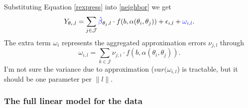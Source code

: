\documentclass[11pt]{amsart}
\newcommand{\tj}{\theta_j}
\newcommand{\ti}{\theta_i}
\newcommand{\ytil}{Y_{\theta_i,l}}
\begin{document}
Substituting Equation \eqref{rexpress} into \eqref{neighbor} we get
\begin{equation}
\ytil = \sum_{j \in \mathcal{J}} \textcolor{blue}{\hat{\beta}}_{\tj,l} \cdot f(b, \alpha(\ti, \tj)) + \epsilon_{i,l} +  \textcolor{blue}{\omega_{i,l}}.
\end{equation}
The extra term $\omega_i$ represents the aggregated approximation errors $\nu_{j,l}$ through
\[ \omega_{i,l} = \sum_{k\in\mathcal{J}} \nu_{j,i} \cdot f(b, \alpha(\ti, \tj)).\]
I'm not sure the variance due to approximation ($var(\omega_{i,l}$) is tractable, but it should be one parameter per $\|l\|$. 

\subsubsection{The full linear model for the data}




%
\end{document}
